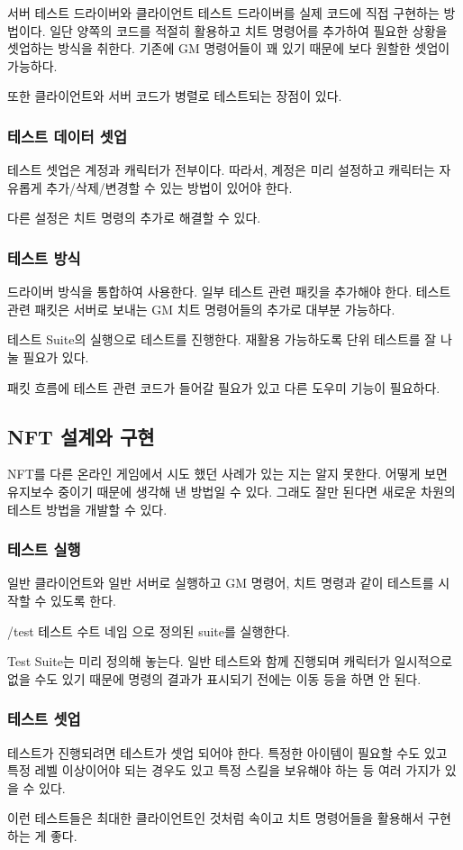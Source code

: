 \documentclass[chapter,kosection, 10.5pt, romanfixed, a4paper]{oblivoir}
\begin{document}
서버 테스트 드라이버와 클라이언트 테스트 드라이버를 실제 코드에 직접 구현하는 방법이다. 
일단 양쪽의 코드를 적절히 활용하고 치트 명령어를 추가하여 필요한 상황을 셋업하는 방식을 취한다. 
기존에 GM 명령어들이 꽤 있기 때문에 보다 원할한 셋업이 가능하다. 

또한 클라이언트와 서버 코드가 병렬로 테스트되는 장점이 있다. 

\subsubsection{테스트 데이터 셋업}
테스트 셋업은 계정과 캐릭터가 전부이다. 따라서, 계정은 미리 설정하고 
캐릭터는 자유롭게 추가/삭제/변경할 수 있는 방법이 있어야 한다. 

다른 설정은 치트 명령의 추가로 해결할 수 있다. 

\subsubsection{테스트 방식}
드라이버 방식을 통합하여 사용한다. 일부 테스트 관련 패킷을 추가해야 한다. 
테스트 관련 패킷은 서버로 보내는 GM 치트 명령어들의 추가로 대부분 가능하다. 

테스트 Suite의 실행으로 테스트를 진행한다. 재활용 가능하도록 단위 테스트를 잘 나눌 필요가 있다. 

패킷 흐름에 테스트 관련 코드가 들어갈 필요가 있고 다른 도우미 기능이 필요하다. 


\subsection{NFT 설계와 구현}
NFT를 다른 온라인 게임에서 시도 했던 사례가 있는 지는 알지 못한다. 
어떻게 보면 유지보수 중이기 때문에 생각해 낸 방법일 수 있다. 
그래도 잘만 된다면 새로운 차원의 테스트 방법을 개발할 수 있다. 

\subsubsection{테스트 실행}
일반 클라이언트와 일반 서버로 실행하고 GM 명령어, 치트 명령과 같이 테스트를 시작할 수 있도록 한다. 

/test 테스트 수트 네임 으로 정의된 suite를 실행한다. 

Test Suite는 미리 정의해 놓는다. 
일반 테스트와 함께 진행되며 캐릭터가 일시적으로 없을 수도 있기 때문에 명령의 결과가 표시되기 전에는 이동 등을 하면 안 된다. 


\subsubsection{테스트 셋업}
테스트가 진행되려면 테스트가 셋업 되어야 한다. 특정한 아이템이 필요할 수도 있고 
특정 레벨 이상이어야 되는 경우도 있고 특정 스킬을 보유해야 하는 등 여러 가지가 있을 수 있다. 

이런 테스트들은 최대한 클라이언트인 것처럼 속이고 치트 명령어들을 활용해서 구현하는 게 좋다. 
\end{document}
